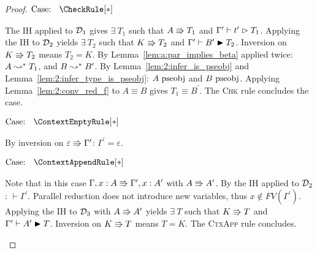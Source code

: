 \begin{proof}
    $\text{Case: }\begin{array}{c} \CheckRule[*] \end{array}$
    \begin{proofcase}
        The IH applied to $\mathcal{D}_{1}$ gives $\exists\ T_1$ such that $A \Rrightarrow T_1$ and $\Gamma^\prime \vdash t^\prime \vartriangleright T_1$.
        Applying the IH to $\mathcal{D}_{2}$ yields $\exists\ T_2$ such that $K \Rrightarrow T_2$ and $\Gamma^\prime \vdash B^\prime \blacktriangleright T_2$.
        Inversion on $K \Rrightarrow T_2$ means $T_2 = K$.
        By Lemma~\ref{lem:a:par_implies_beta} applied twice: $A \leadsto^* T_1$, and $B \leadsto^* B^\prime$.
        By Lemma~\ref{lem:2:infer_is_pseobj} and Lemma~\ref{lem:2:infer_type_is_pseobj}: $A~\mbox{\normalfont pseobj}$ and $B~\mbox{\normalfont pseobj}$.
        Applying Lemma~\ref{lem:2:conv_red_f} to $A \equiv B$ gives $T_1 \equiv B^\prime$.
        The \textsc{Chk} rule concludes the case.
    \end{proofcase}

    $\text{Case: }\begin{array}{c} \ContextEmptyRule[*] \end{array}$
    \begin{proofcase}
        By inversion on $\varepsilon \Rrightarrow \Gamma^\prime$: $\Gamma^\prime = \varepsilon$.
    \end{proofcase}

    $\text{Case: }\begin{array}{c} \ContextAppendRule[*] \end{array}$
    \begin{proofcase}
        Note that in this case $\Gamma, x : A \Rrightarrow \Gamma^\prime, x : A^\prime$ with $A \Rrightarrow A^\prime$.
        By the IH applied to $\mathcal{D}_{2}$: $\vdash \Gamma^\prime$.
        Parallel reduction does not introduce new variables, thus $x \notin FV(\Gamma^\prime)$.
        Applying the IH to $\mathcal{D}_{3}$ with $A \Rrightarrow A^\prime$ yields $\exists\ T$ such that $K \Rrightarrow T$ and $\Gamma^\prime \vdash A^\prime \blacktriangleright T$.
        Inversion on $K \Rrightarrow T$ means $T = K$.
        The \textsc{CtxApp} rule concludes.
    \end{proofcase}
\end{proof}